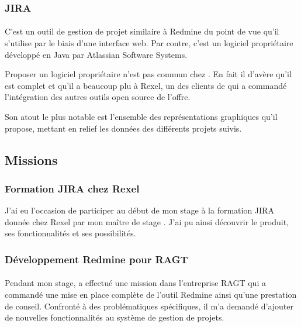 \subsubsection{JIRA}

\paragraph{}
C'est un outil de gestion de projet similaire à Redmine du point de vue qu'il s'utilise par le biais d'une interface web.
Par contre, c'est un logiciel propriétaire développé en Java par Atlassian Software Systems.

Proposer un logiciel propriétaire n'est pas commun chez \asmile.
En fait il d'avère qu'il est complet et qu'il a beaucoup plu à Rexel, un des clients de \asmile{} qui a commandé l'intégration des autres outils open source de l'offre.

Son atout le plus notable est l'ensemble des représentations graphiques qu'il propose, mettant en relief les données des différents projets suivis.



\subsection{Missions}

\subsubsection{Formation JIRA chez Rexel}

J'ai eu l'occasion de participer au début de mon stage à la formation JIRA donnée chez Rexel par mon maître de stage \agulet.
J'ai pu ainsi découvrir le produit, ses fonctionnalités et ses possibilités.



\subsubsection{Développement Redmine pour RAGT}

\paragraph{}
Pendant mon stage, \agulet{} a effectué une mission dans l'entreprise RAGT qui a commandé une mise en place complète de l'outil Redmine ainsi qu'une prestation de conseil.
Confronté à des problématiques spécifiques, il m'a demandé d'ajouter de nouvelles fonctionnalités au système de gestion de projets.

